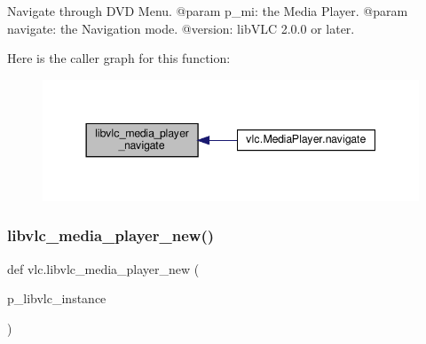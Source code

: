 \begin{DoxyVerb}Navigate through DVD Menu.
@param p_mi: the Media Player.
@param navigate: the Navigation mode.
@version: libVLC 2.0.0 or later.
\end{DoxyVerb}
 Here is the caller graph for this function\+:
\nopagebreak
\begin{figure}[H]
\begin{center}
\leavevmode
\includegraphics[width=344pt]{namespacevlc_a1fea7d3530a5c500357969307e5bea7e_icgraph}
\end{center}
\end{figure}
\mbox{\label{namespacevlc_afb765953dae813dbf71b86a8aec719fe}} 
\subsubsection{\texorpdfstring{libvlc\+\_\+media\+\_\+player\+\_\+new()}{libvlc\_media\_player\_new()}}
{\footnotesize\ttfamily def vlc.\+libvlc\+\_\+media\+\_\+player\+\_\+new (\begin{DoxyParamCaption}\item[{}]{p\+\_\+libvlc\+\_\+instance }\end{DoxyParamCaption})}

